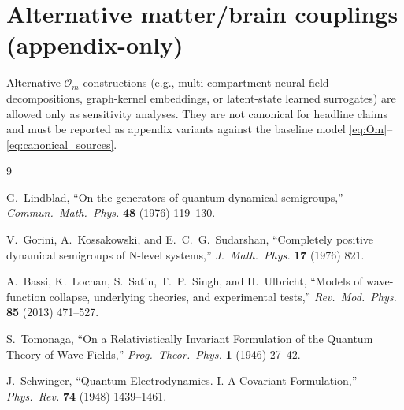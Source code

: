 \documentclass[reprint,amsmath,amssymb,aps,showkeys]{revtex4-2}
\theoremstyle{remark}
\newcommand{\cO}{\mathcal{O}}
\begin{document}
\section{Alternative matter/brain couplings (appendix-only)}
\label{app:coupling_alts}
Alternative $\cO_m$ constructions (e.g., multi-compartment neural field decompositions, graph-kernel embeddings,
or latent-state learned surrogates) are allowed only as sensitivity analyses. They are not canonical for headline
claims and must be reported as appendix variants against the baseline model \eqref{eq:Om}--\eqref{eq:canonical_sources}.

\begin{thebibliography}{9}

G.~Lindblad, ``On the generators of quantum dynamical semigroups,''
\emph{Commun.\ Math.\ Phys.} \textbf{48} (1976) 119--130.

V.~Gorini, A.~Kossakowski, and E.~C.~G.~Sudarshan,
``Completely positive dynamical semigroups of N-level systems,''
\emph{J.\ Math.\ Phys.} \textbf{17} (1976) 821.

A.~Bassi, K.~Lochan, S.~Satin, T.~P.~Singh, and H.~Ulbricht,
``Models of wave-function collapse, underlying theories, and experimental tests,''
\emph{Rev.\ Mod.\ Phys.} \textbf{85} (2013) 471--527.

S.~Tomonaga,
``On a Relativistically Invariant Formulation of the Quantum Theory of Wave Fields,''
\emph{Prog.\ Theor.\ Phys.} \textbf{1} (1946) 27--42.

J.~Schwinger,
``Quantum Electrodynamics. I. A Covariant Formulation,''
\emph{Phys.\ Rev.} \textbf{74} (1948) 1439--1461.

\end{thebibliography}
\end{document}
